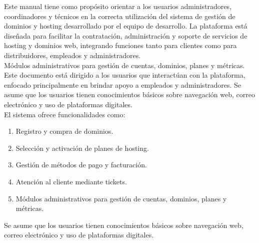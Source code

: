 Este manual tiene como propósito orientar a los usuarios administradores, coordinadores y técnicos en la correcta utilización del sistema de gestión de dominios y hosting desarrollado por el equipo de desarrollo. La plataforma está diseñada para facilitar la contratación, administración y soporte de servicios de hosting y dominios web, integrando funciones tanto para clientes como para distribuidores, empleados y administradores.\\ 

Módulos administrativos para gestión de cuentas, dominios, planes y métricas.\\

Este documento está dirigido a los usuarios que interactúan con la plataforma, enfocado principalmente en brindar apoyo a empleados y administradores. Se asume que los usuarios tienen conocimientos básicos sobre navegación web, correo electrónico y uso de plataformas digitales.\\

El sistema ofrece funcionalidades como:

\begin{enumerate}
    \item Registro y compra de dominios.
    \item Selección y activación de planes de hosting.
    \item Gestión de métodos de pago y facturación.
    \item Atención al cliente mediante tickets.
    \item Módulos administrativos para gestión de cuentas, dominios, planes y métricas.
\end{enumerate}

Se asume que los usuarios tienen conocimientos básicos sobre navegación web, correo electrónico y uso de plataformas digitales.
